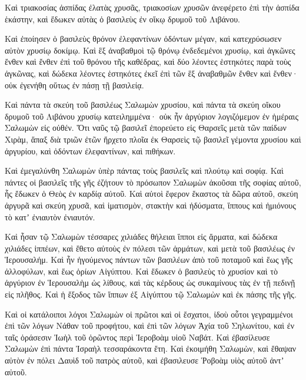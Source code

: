 {Καὶ τριακοσίας ἀσπίδας ἐλατὰς χρυσᾶς, τριακοσίων χρυσῶν ἀνεφέρετο ἐπὶ τὴν ἀσπίδα ἑκάστην, καὶ ἔδωκεν αὐτὰς ὁ βασιλεὺς ἐν οἴκῳ δρυμοῦ τοῦ Λιβάνου.
\par }{\PP {}Καὶ ἐποίησεν ὁ βασιλεὺς θρόνον ἐλεφαντίνων ὀδόντων μέγαν, καὶ κατεχρύσωσεν αὐτὸν χρυσίῳ δοκίμῳ.
Καὶ ἓξ ἀναβαθμοὶ τῷ θρόνῳ ἐνδεδεμένοι χρυσίῳ, καὶ ἀγκῶνες ἔνθεν καὶ ἔνθεν ἐπὶ τοῦ θρόνου τῆς καθέδρας, καὶ δύο λέοντες ἑστηκότες παρὰ τοὺς ἀγκῶνας,
καὶ δώδεκα λέοντες ἑστηκότες ἐκεῖ ἐπὶ τῶν ἓξ ἀναβαθμῶν ἔνθεν καὶ ἔνθεν· οὐκ ἐγενήθη οὕτως ἐν πάσῃ τῇ βασιλείᾳ.
\par }{\PP {}Καὶ πάντα τὰ σκεύη τοῦ βασιλέως Σαλωμὼν χρυσίου, καὶ πάντα τὰ σκεύη οἴκου δρυμοῦ τοῦ Λιβάνου χρυσίῳ κατειλημμένα· οὐκ ἦν ἀργύριον λογιζόμεμον ἐν ἡμέραις Σαλωμὼν εἰς οὐθέν.
Ὅτι ναῦς τῷ βασιλεῖ ἐπορεύετο εἰς Θαρσεῖς μετὰ τῶν παίδων Χιρὰμ, ἅπαξ διὰ τριῶν ἐτῶν ἤρχετο πλοῖα ἐκ Θαρσεὶς τῷ βασιλεῖ γέμοντα χρυσίου καὶ ἀργυρίου, καὶ ὀδόντων ἐλεφαντίνων, καὶ πιθήκων.
\par }{\PP {}Καὶ ἐμεγαλύνθη Σαλωμὼν ὑπὲρ πάντας τοὺς βασιλεῖς καὶ πλούτῳ καὶ σοφίᾳ.
Καὶ πάντες οἱ βασιλεῖς τῆς γῆς ἐζήτουν τὸ πρόσωπον Σαλωμὼν ἀκοῦσαι τῆς σοφίας αὐτοῦ, ἧς ἔδωκεν ὁ Θεὸς ἐν καρδίᾳ αὐτοῦ.
Καὶ αὐτοὶ ἔφερον ἕκαστος τὰ δῶρα αὐτοῦ, σκεύη ἀργυρᾶ καὶ σκεύη χρυσᾶ, καὶ ἱματισμὸν, στακτὴν καὶ ἡδύσματα, ἵππους καὶ ἡμιόνους τὸ κατʼ ἐνιαυτὸν ἐνιαυτόν.
\par }{\PP {}Καὶ ἦσαν τῷ Σαλωμὼν τέσσαρες χιλιάδες θήλειαι ἵπποι εἰς ἅρματα, καὶ δώδεκα χιλιάδες ἱππέων, καὶ ἔθετο αὐτοὺς ἐν πόλεσι τῶν ἁρμάτων, καὶ μετὰ τοῦ βασιλέως ἐν Ἱερουσαλήμ.
Καὶ ἦν ἡγούμενος πάντων τῶν βασιλέων ἀπὸ τοῦ ποταμοῦ καὶ ἕως γῆς ἀλλοφύλων, καὶ ἕως ὁρίων Αἰγύπτου.
Καὶ ἔδωκεν ὁ βασιλεὺς τὸ χρυσίον καὶ τὸ ἀργύριον ἐν Ἱερουσαλὴμ ὡς λίθους, καὶ τὰς κέρδους ὡς συκαμίνους τὰς ἐν τῇ πεδινῇ εἰς πλῆθος.
Καὶ ἡ ἔξοδος τῶν ἵππων ἐξ Αἰγύπτου τῷ Σαλωμὼν καὶ ἐκ πάσης τῆς γῆς.
\par }{\PP {}Καὶ οἱ κατάλοιποι λόγοι Σαλωμὼν οἱ πρῶτοι καὶ οἱ ἔσχατοι, ἰδοὺ οὗτοι γεγραμμένοι ἐπὶ τῶν λόγων Νάθαν τοῦ προφήτου, καὶ ἐπὶ τῶν λόγων Ἀχία τοῦ Σηλωνίτου, καὶ ἐν ταῖς ὁράσεσιν Ἰωὴλ τοῦ ὁρῶντος περὶ Ἱεροβοὰμ υἱοῦ Ναβάτ.
Καὶ ἐβασίλευσε Σαλωμὼν ἐπὶ πάντα Ἰσραὴλ τεσσαράκοντα ἔτη.
Καὶ ἐκοιμήθη Σαλωμὼν, καὶ ἔθαψαν αὐτὸν ἐν πόλει Δαυὶδ τοῦ πατρὸς αὐτοῦ, καὶ ἐβασιλευσε Ῥοβοὰμ υἱὸς αὐτοῦ ἀντʼ αὐτοῦ.

}

